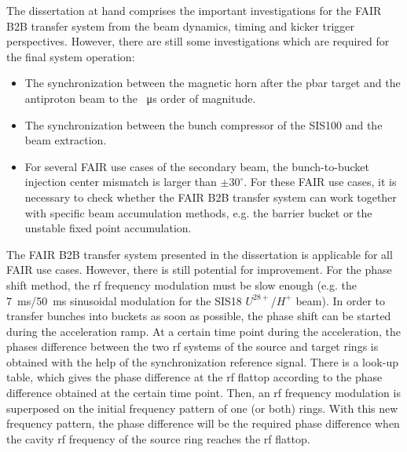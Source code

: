 The dissertation at hand comprises the important investigations for the FAIR B2B transfer system from the beam dynamics, timing and kicker trigger perspectives. However, there are still some investigations which are required for the final system operation:
\begin{itemize}
	\item The synchronization between the magnetic horn after the pbar target and the antiproton beam to the \SI{}{\us} order of magnitude.

	\item  The synchronization between the bunch compressor of the SIS100 and the beam extraction.

	\item  
For several FAIR use cases of the secondary beam, the bunch-to-bucket injection center mismatch is larger than $\pm30^\circ$. For these FAIR use cases, it is necessary to check whether the FAIR B2B transfer system can work together with specific beam accumulation methods, e.g. the barrier bucket or the unstable fixed point accumulation.


\end{itemize}


The FAIR B2B transfer system presented in the dissertation is applicable for all FAIR use cases. However, there is still potential for improvement. For the phase shift method, the rf frequency modulation must be slow enough (e.g. the \SI{7}{\ms}/\SI{50}{\ms} sinusoidal modulation for the SIS18 $U^\mathit{28+}$/$H^\mathit{+}$ beam). In order to transfer bunches into buckets as soon as possible, the phase shift can be started during the acceleration ramp. At a certain time point during the acceleration, the phases difference between the two rf systems of the source and target rings is obtained with the help of the synchronization reference signal. There is a look-up table, which gives the phase difference at the rf flattop according to the phase difference obtained at the certain time point. Then, an rf frequency modulation is superposed on the initial frequency pattern of one (or both) rings. With this new frequency pattern, the phase difference will be the required phase difference when the cavity rf frequency of the source ring reaches the rf flattop. 

